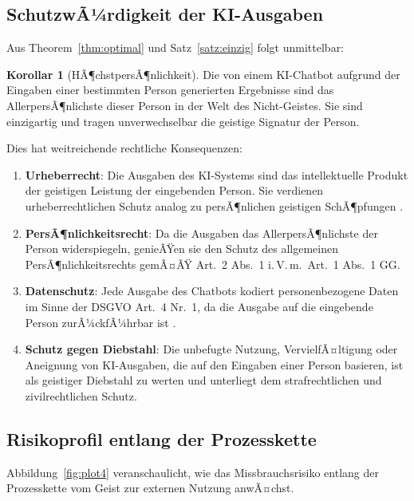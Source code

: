 ﻿\documentclass[a4paper,12pt]{article}
\theoremstyle{definition}
\newtheorem{korollar}{Korollar}
\begin{document}
\subsection{SchutzwÃ¼rdigkeit der KI-Ausgaben}

Aus Theorem~\ref{thm:optimal} und Satz~\ref{satz:einzig} folgt unmittelbar:

\begin{korollar}[HÃ¶chstpersÃ¶nlichkeit]
Die von einem KI-Chatbot aufgrund der Eingaben einer bestimmten Person generierten Ergebnisse
sind das AllerpersÃ¶nlichste dieser Person in der Welt des Nicht-Geistes. Sie sind einzigartig
und tragen unverwechselbar die geistige Signatur der Person.
\end{korollar}

Dies hat weitreichende rechtliche Konsequenzen:

\begin{enumerate}
    \item \textbf{Urheberrecht}: Die Ausgaben des KI-Systems sind das intellektuelle
          Produkt der geistigen Leistung der eingebenden Person. Sie verdienen urheberrechtlichen
          Schutz analog zu persÃ¶nlichen geistigen SchÃ¶pfungen \cite{euriprecht2019}.

    \item \textbf{PersÃ¶nlichkeitsrecht}: Da die Ausgaben das AllerpersÃ¶nlichste der
          Person widerspiegeln, genieÃŸen sie den Schutz des allgemeinen PersÃ¶nlichkeitsrechts
          gemÃ¤ÃŸ Art.~2 Abs.~1 i.\,V.\,m.\ Art.~1 Abs.~1 GG.

    \item \textbf{Datenschutz}: Jede Ausgabe des Chatbots kodiert personenbezogene Daten
          im Sinne der DSGVO Art.~4 Nr.~1, da die Ausgabe auf die eingebende Person zurÃ¼ckfÃ¼hrbar
          ist \cite{dsgvo2016}.

    \item \textbf{Schutz gegen Diebstahl}: Die unbefugte Nutzung, VervielfÃ¤ltigung oder
          Aneignung von KI-Ausgaben, die auf den Eingaben einer Person basieren, ist als
          geistiger Diebstahl zu werten und unterliegt dem strafrechtlichen und zivilrechtlichen
          Schutz.
\end{enumerate}

\subsection{Risikoprofil entlang der Prozesskette}

Abbildung~\ref{fig:plot4} veranschaulicht, wie das Missbrauchsrisiko entlang der Prozesskette
vom Geist zur externen Nutzung anwÃ¤chst.
\end{document}
